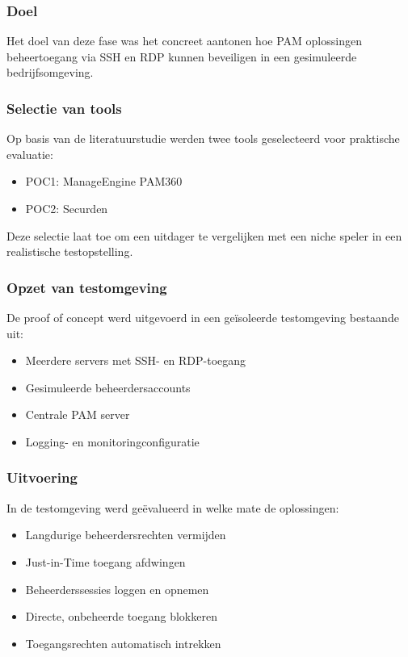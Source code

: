\subsubsection{Doel}
Het doel van deze fase was het concreet aantonen hoe PAM oplossingen beheertoegang via SSH en RDP kunnen beveiligen in een gesimuleerde bedrijfsomgeving.

\subsubsection{Selectie van tools}
Op basis van de literatuurstudie werden twee tools geselecteerd voor praktische evaluatie:
\begin{itemize}
	\item POC1: ManageEngine PAM360
	\item POC2: Securden
\end{itemize}
Deze selectie laat toe om een uitdager te vergelijken met een niche speler in een realistische testopstelling.

\subsubsection{Opzet van testomgeving}
De proof of concept werd uitgevoerd in een geïsoleerde testomgeving bestaande uit:
\begin{itemize}
	\item Meerdere servers met SSH- en RDP-toegang
	\item Gesimuleerde beheerdersaccounts
	\item Centrale PAM server
	\item Logging- en monitoringconfiguratie
\end{itemize}

\subsubsection{Uitvoering}
In de testomgeving werd geëvalueerd in welke mate de oplossingen:
\begin{itemize}
	\item Langdurige beheerdersrechten vermijden
	\item Just-in-Time toegang afdwingen
	\item Beheerderssessies loggen en opnemen
	\item Directe, onbeheerde toegang blokkeren
	\item Toegangsrechten automatisch intrekken
\end{itemize}

